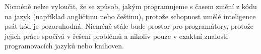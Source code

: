\documentclass[FM,DP]{tulthesis}
\begin{document}
		Nicméně nelze vyloučit, že se způsob, jakým programujeme s časem změní z kódu na jazyk (například angličtinu nebo češtinu), protože schopnost umělé inteligence psát kód je pozoruhodná. Nicméně stále bude prostor pro programátory, protože jejich práce spočívá v řešení problémů a nikoliv pouze v exaktní znalosti programovacích jazyků nebo knihoven.
		
		\printbibliography[title={Použitá literatura}] %
	
\end{document}
